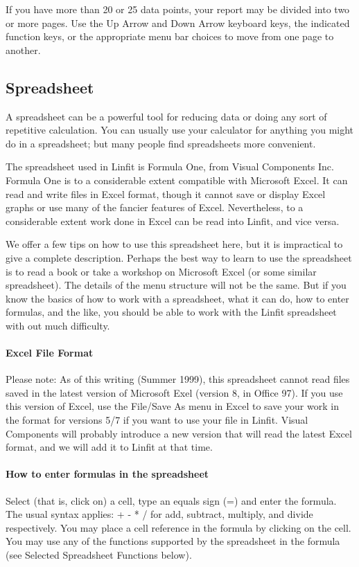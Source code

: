 If you have more than 20 or 25 data points, your report may be
divided into two or more pages.  Use the Up Arrow and Down Arrow
keyboard keys, the indicated function keys, or the appropriate menu
bar choices to move from one page to another.

\subsection*{Spreadsheet}

A spreadsheet can be a powerful tool for reducing data or doing any
sort of repetitive calculation.  You can usually use your calculator
for anything you might do in a spreadsheet; but many people find
spreadsheets more convenient.

The spreadsheet used in Linfit is Formula One, from Visual
Components Inc.  Formula One is to a considerable extent compatible
with Microsoft Excel.  It can read and write files in Excel format,
though it cannot save or display Excel graphs or use many of the
fancier features of Excel.  Nevertheless, to a considerable extent
work done in Excel can be read into Linfit, and vice versa.

We offer a few tips on how to use this spreadsheet here, but it is
impractical to give a complete description.  Perhaps the best way to
learn to use the spreadsheet is to read a book or take a workshop on
Microsoft Excel (or some similar spreadsheet).  The details of the
menu structure will not be the same.  But if you know the basics of
how to work with a spreadsheet, what it can do, how to enter formulas,
and the like, you should be able to work with the Linfit
spreadsheet with out much difficulty.

\paragraph*{Excel File Format} Please note: As of this writing (Summer
1999), this spreadsheet cannot read files saved in the latest version
of Microsoft Exel (version 8, in Office 97).  If you use this version
of Excel, use the File/Save As menu in Excel to save your work in the
format for versions 5/7 if you want to use your file in Linfit.
Visual Components will probably introduce a new version that will read
the latest Excel format, and we will add it to Linfit at that
time.

\paragraph*{How to enter formulas in the spreadsheet}
Select (that is, click on) a cell, type an equals sign (=) and enter
the formula.  The usual syntax applies: + - * / for add, subtract,
multiply, and divide respectively.  You may place a cell reference in
the formula by clicking on the cell.  You may use any of the functions
supported by the spreadsheet in the formula (see Selected Spreadsheet
Functions below).

